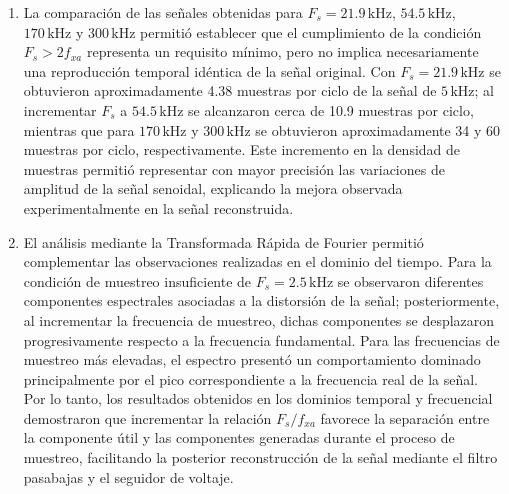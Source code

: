 \documentclass[conference]{IEEEtran}
\begin{document}
\begin{enumerate}
    \item La comparación de las señales obtenidas para $F_s=21.9\,\text{kHz}$, $54.5\,\text{kHz}$, $170\,\text{kHz}$ y $300\,\text{kHz}$ permitió establecer que el cumplimiento de la condición $F_s>2f_{xa}$ representa un requisito mínimo, pero no implica necesariamente una reproducción temporal idéntica de la señal original. Con $F_s=21.9\,\text{kHz}$ se obtuvieron aproximadamente 4.38 muestras por ciclo de la señal de $5\,\text{kHz}$; al incrementar $F_s$ a $54.5\,\text{kHz}$ se alcanzaron cerca de 10.9 muestras por ciclo, mientras que para $170\,\text{kHz}$ y $300\,\text{kHz}$ se obtuvieron aproximadamente 34 y 60 muestras por ciclo, respectivamente. Este incremento en la densidad de muestras permitió representar con mayor precisión las variaciones de amplitud de la señal senoidal, explicando la mejora observada experimentalmente en la señal reconstruida.

    \item El análisis mediante la Transformada Rápida de Fourier permitió complementar las observaciones realizadas en el dominio del tiempo. Para la condición de muestreo insuficiente de $F_s=2.5\,\text{kHz}$ se observaron diferentes componentes espectrales asociadas a la distorsión de la señal; posteriormente, al incrementar la frecuencia de muestreo, dichas componentes se desplazaron progresivamente respecto a la frecuencia fundamental. Para las frecuencias de muestreo más elevadas, el espectro presentó un comportamiento dominado principalmente por el pico correspondiente a la frecuencia real de la señal. Por lo tanto, los resultados obtenidos en los dominios temporal y frecuencial demostraron que incrementar la relación $F_s/f_{xa}$ favorece la separación entre la componente útil y las componentes generadas durante el proceso de muestreo, facilitando la posterior reconstrucción de la señal mediante el filtro pasabajas y el seguidor de voltaje.

\end{enumerate}


\end{document}
